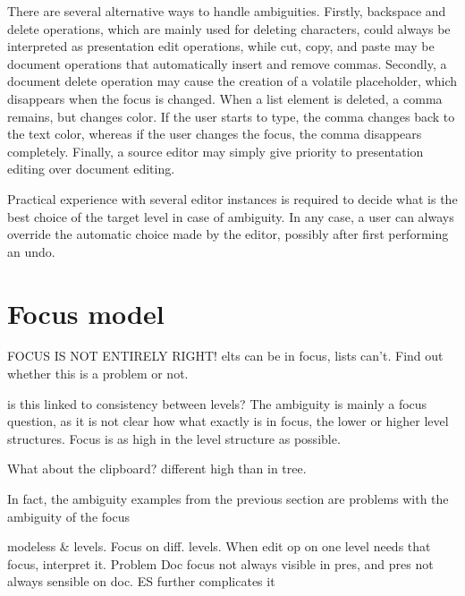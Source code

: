 There are several alternative ways to handle ambiguities. Firstly, backspace and delete operations, which are mainly used for deleting characters, could always be interpreted as presentation edit operations, while cut, copy, and paste may be document operations that automatically insert and remove commas. Secondly, a document delete operation may cause the creation of a volatile placeholder, which disappears when the focus is changed. When a list element is deleted, a comma remains, but changes color. If the user starts to type, the comma changes back to the text color, whereas if the user changes the focus, the comma disappears completely. Finally, a source editor may simply give priority to presentation editing over document editing. 

Practical experience with several editor instances is required to decide what is the best choice of the target level in case of ambiguity. In any case, a user can always override the automatic choice made by the editor, possibly after first performing an undo.




%																
%																
%																
\section{Focus model} \label{sect:focus}
\bc
FOCUS IS NOT ENTIRELY RIGHT! elts can be  in focus, lists can't. Find out whether this is a problem or not.
\ec


\bc
is this linked to consistency between levels?
The ambiguity is mainly a focus question, as it is not clear how what exactly is in focus, the lower or higher level structures. Focus is as high in the level structure as possible.

What about the clipboard?
different high than in tree.

In fact, the ambiguity examples from the previous section are problems with the ambiguity of the focus
\ec

\bc modeless & levels. Focus on diff. levels. When edit op on one level needs that focus, interpret it. Problem Doc focus not always visible in pres, and pres not always sensible on doc. ES further complicates it
\ec


